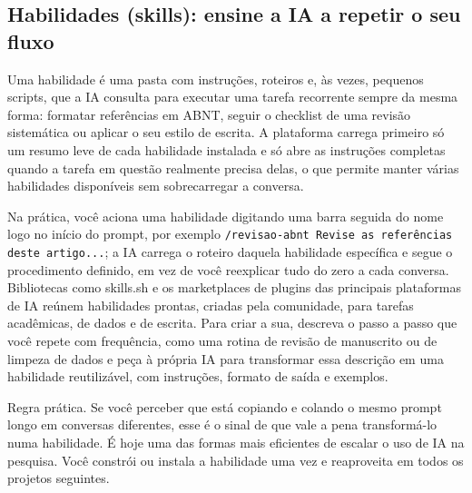 \documentclass[11pt,a4paper]{article}
\begin{document}
\subsection*{Habilidades (skills): ensine a IA a repetir o seu fluxo}
Uma habilidade é uma pasta com instruções, roteiros e, às vezes, pequenos scripts, que a IA consulta para executar uma tarefa recorrente sempre da mesma forma: formatar referências em ABNT, seguir o checklist de uma revisão sistemática ou aplicar o seu estilo de escrita. A plataforma carrega primeiro só um resumo leve de cada habilidade instalada e só abre as instruções completas quando a tarefa em questão realmente precisa delas, o que permite manter várias habilidades disponíveis sem sobrecarregar a conversa.

Na prática, você aciona uma habilidade digitando uma barra seguida do nome logo no início do prompt, por exemplo \texttt{/revisao-abnt Revise as referências deste artigo...}; a IA carrega o roteiro daquela habilidade específica e segue o procedimento definido, em vez de você reexplicar tudo do zero a cada conversa. Bibliotecas como skills.sh e os marketplaces de plugins das principais plataformas de IA reúnem habilidades prontas, criadas pela comunidade, para tarefas acadêmicas, de dados e de escrita. Para criar a sua, descreva o passo a passo que você repete com frequência, como uma rotina de revisão de manuscrito ou de limpeza de dados e peça à própria IA para transformar essa descrição em uma habilidade reutilizável, com instruções, formato de saída e exemplos.
\begin{dica}
Regra prática. Se você perceber que está copiando e colando o mesmo prompt longo em conversas diferentes, esse é o sinal de que vale a pena transformá-lo numa habilidade. É hoje uma das formas mais eficientes de escalar o uso de IA na pesquisa. Você constrói ou instala a habilidade uma vez e reaproveita em todos os projetos seguintes.
\end{dica}

\clearpage
\end{document}
